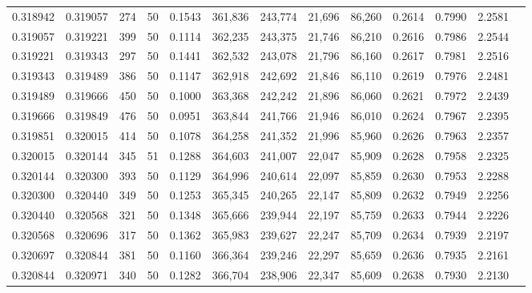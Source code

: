\begin{tabular}{rrrrrrrrrrrrr}
0.318942 & 0.319057 &   274 &  50 &                                     0.1543 & 361,836 & 243,774 &  21,696 &  86,260 & 0.2614 & 0.7990 & 2.2581 \\
0.319057 & 0.319221 &   399 &  50 &                                     0.1114 & 362,235 & 243,375 &  21,746 &  86,210 & 0.2616 & 0.7986 & 2.2544 \\
0.319221 & 0.319343 &   297 &  50 &                                     0.1441 & 362,532 & 243,078 &  21,796 &  86,160 & 0.2617 & 0.7981 & 2.2516 \\
0.319343 & 0.319489 &   386 &  50 &                                     0.1147 & 362,918 & 242,692 &  21,846 &  86,110 & 0.2619 & 0.7976 & 2.2481 \\
0.319489 & 0.319666 &   450 &  50 &                                     0.1000 & 363,368 & 242,242 &  21,896 &  86,060 & 0.2621 & 0.7972 & 2.2439 \\
0.319666 & 0.319849 &   476 &  50 &                                     0.0951 & 363,844 & 241,766 &  21,946 &  86,010 & 0.2624 & 0.7967 & 2.2395 \\
0.319851 & 0.320015 &   414 &  50 &                                     0.1078 & 364,258 & 241,352 &  21,996 &  85,960 & 0.2626 & 0.7963 & 2.2357 \\
0.320015 & 0.320144 &   345 &  51 &                                     0.1288 & 364,603 & 241,007 &  22,047 &  85,909 & 0.2628 & 0.7958 & 2.2325 \\
0.320144 & 0.320300 &   393 &  50 &                                     0.1129 & 364,996 & 240,614 &  22,097 &  85,859 & 0.2630 & 0.7953 & 2.2288 \\
0.320300 & 0.320440 &   349 &  50 &                                     0.1253 & 365,345 & 240,265 &  22,147 &  85,809 & 0.2632 & 0.7949 & 2.2256 \\
0.320440 & 0.320568 &   321 &  50 &                                     0.1348 & 365,666 & 239,944 &  22,197 &  85,759 & 0.2633 & 0.7944 & 2.2226 \\
0.320568 & 0.320696 &   317 &  50 &                                     0.1362 & 365,983 & 239,627 &  22,247 &  85,709 & 0.2634 & 0.7939 & 2.2197 \\
0.320697 & 0.320844 &   381 &  50 &                                     0.1160 & 366,364 & 239,246 &  22,297 &  85,659 & 0.2636 & 0.7935 & 2.2161 \\
0.320844 & 0.320971 &   340 &  50 &                                     0.1282 & 366,704 & 238,906 &  22,347 &  85,609 & 0.2638 & 0.7930 & 2.2130 \\

\end{tabular}

